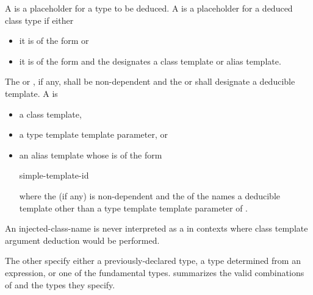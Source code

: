 \pnum
{}%
%
%
%
%
%
%
%
%
%
%
%
%
%
%
%
A 
is a placeholder for
a type to be deduced.
%
A  is a placeholder for
a deduced class type if either
\begin{itemize}
\item
it is of the form
   or
\item
it is of the form   and
the  designates
a class template or alias template.
\end{itemize}
The  or ,
if any, shall be non-dependent and
the  or 
shall designate a deducible template.
A  is
\begin{itemize}
\item
a class template,
\item
a type template template parameter, or
\item
an alias template  whose  is of the form

\begin{ncsimplebnf}
   simple-template-id
\end{ncsimplebnf}

where the  (if any) is non-dependent and
the  of the 
names a deducible template
other than a type template template parameter of .
\end{itemize}
\begin{note}
An injected-class-name is never interpreted as a 
in contexts where class template argument deduction would be performed.
\end{note}
The other
specify either a previously-declared type, a type determined from an
expression, or one of the
fundamental types.
 summarizes the valid combinations of
and the types they specify.

